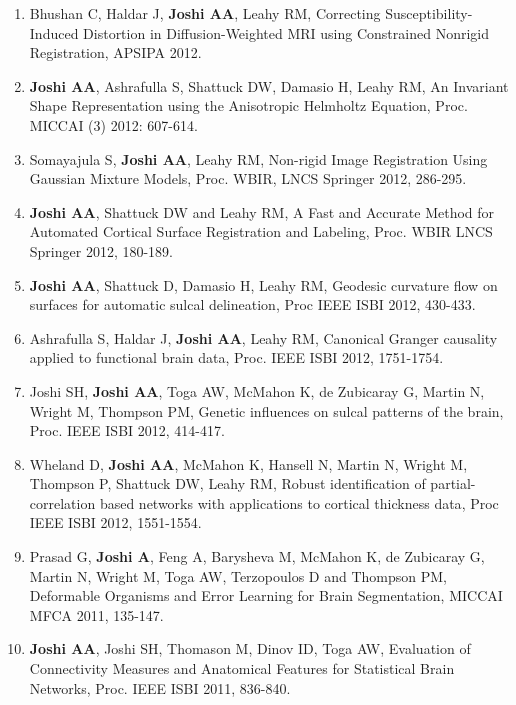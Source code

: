 \documentclass[overlapped,line,letterpaper]{res}
\begin{document}
\begin{resume}
\begin{enumerate}
    \item Bhushan C, Haldar J, \textbf{Joshi AA}, Leahy RM, {Correcting Susceptibility-Induced Distortion in Diffusion-Weighted MRI using Constrained Nonrigid Registration}, APSIPA 2012. 

    \item \textbf{Joshi AA}, Ashrafulla S, Shattuck DW, Damasio H, Leahy RM, {An Invariant Shape Representation using the Anisotropic Helmholtz Equation}, Proc. MICCAI (3) 2012: 607-614.

    \item Somayajula S, \textbf{Joshi AA}, Leahy RM, {Non-rigid Image Registration Using Gaussian Mixture Models}, Proc. WBIR, LNCS Springer 2012, 286-295. 

    \item \textbf{Joshi AA}, Shattuck DW and Leahy RM, {A Fast and Accurate Method for Automated Cortical Surface Registration and Labeling}, Proc. WBIR LNCS Springer 2012, 180-189.

    \item \textbf{Joshi AA}, Shattuck D, Damasio H, Leahy RM, {Geodesic curvature flow on surfaces for automatic sulcal delineation}, Proc IEEE ISBI 2012, 430-433.

    \item Ashrafulla S, Haldar J, \textbf{Joshi AA}, Leahy RM, {Canonical Granger causality applied to functional brain data}, Proc. IEEE ISBI 2012, 1751-1754.

    \item Joshi SH, \textbf{Joshi AA}, Toga AW, McMahon K, de Zubicaray G, Martin N, Wright M, Thompson PM, {Genetic influences on sulcal patterns of the brain}, Proc. IEEE ISBI 2012, 414-417.

    \item Wheland D, \textbf{Joshi AA}, McMahon K, Hansell N, Martin N, Wright M, Thompson P, Shattuck DW, Leahy RM, {Robust identification of partial-correlation based networks with applications to cortical thickness data}, Proc IEEE ISBI 2012, 1551-1554.

    \item Prasad  G, \textbf{Joshi A}, Feng A, Barysheva M, McMahon K, de Zubicaray G, Martin N, Wright M, Toga AW, Terzopoulos D and Thompson PM, {Deformable Organisms and Error Learning for Brain Segmentation}, MICCAI MFCA 2011, 135-147.

    \item \textbf{Joshi AA}, Joshi SH, Thomason M, Dinov ID, Toga AW, {Evaluation of Connectivity Measures and Anatomical Features for Statistical Brain Networks}, Proc. IEEE ISBI 2011, 836-840. 


\end{enumerate}
\end{resume}
\end{document}
